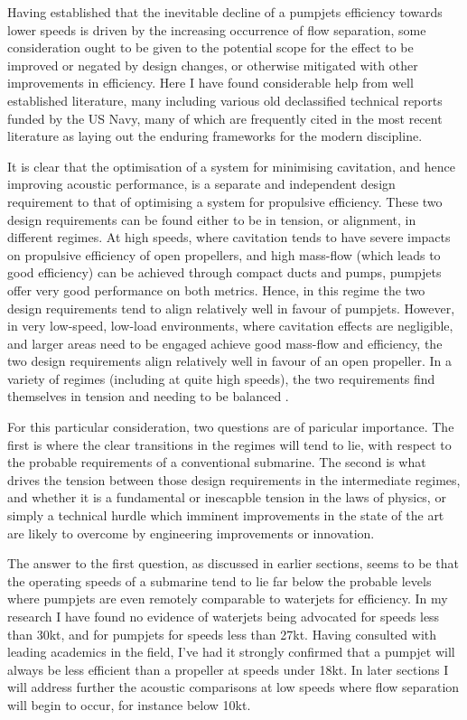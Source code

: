 \documentclass{article}\usepackage[]{graphicx}\usepackage[]{color}
\begin{document}
Having established that the inevitable decline of a pumpjets efficiency towards lower speeds is driven by the increasing occurrence of flow separation, some consideration ought to be given to the potential scope for the effect to be improved or negated by design changes, or otherwise mitigated with other improvements in efficiency.  Here I have found considerable help from well established literature, many including various old declassified technical reports funded by the US Navy, many of which are frequently cited in the most recent literature as laying out the enduring frameworks for the modern discipline.

It is clear that the optimisation of a system for minimising cavitation, and hence improving acoustic performance, is a separate and independent design requirement to that of optimising a system for propulsive efficiency.  These two design requirements can be found either to be in tension, or alignment, in different regimes.  At high speeds, where cavitation tends to have severe impacts on propulsive efficiency of open propellers, and high mass-flow (which leads to good efficiency) can be achieved through compact ducts and pumps, pumpjets offer very good performance on both metrics.  Hence, in this regime the two design requirements tend to align relatively well in favour of pumpjets.  However, in very low-speed, low-load environments, where cavitation effects are negligible, and larger areas need to be engaged achieve good mass-flow and efficiency, the two design requirements align relatively well in favour of an open propeller.  In a variety of regimes (including at quite high speeds), the two requirements find themselves in tension and needing to be balanced \parencite{gearhart1966selection}.

For this particular consideration, two questions are of paricular importance.  The first is where the clear transitions in the regimes will tend to lie, with respect to the probable requirements of a conventional submarine.  The second is what drives the tension between those design requirements in the intermediate regimes, and whether it is a fundamental or inescapble tension in the laws of physics, or simply a technical hurdle which imminent improvements in the state of the art are likely to overcome by engineering improvements or innovation.

The answer to the first question, as discussed in earlier sections, seems to be that the operating speeds of a submarine tend to lie far below the probable levels where pumpjets are even remotely comparable to waterjets for efficiency.  In my research I have found no evidence of waterjets being advocated for speeds less than 30kt, and for pumpjets for speeds less than 27kt.  Having consulted with leading academics in the field, I've had it strongly confirmed that a pumpjet will always be less efficient than a propeller at speeds under 18kt.  In later sections I will address further the acoustic comparisons at low speeds where flow separation will begin to occur, for instance below 10kt.
\end{document}

